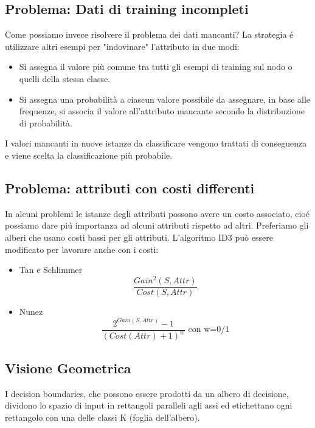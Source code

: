 \documentclass{article}
\begin{document}
\subsection{Problema: Dati di training incompleti}
Come possiamo invece risolvere il problema dei dati mancanti? La strategia é utilizzare altri esempi per "indovinare" l'attributo in due modi:
\begin{itemize}
    \item Si assegna il valore più comune tra tutti gli esempi di training sul nodo o quelli della stessa classe.
    \item Si assegna una probabilità a ciascun valore possibile da assegnare, in base alle frequenze, si associa il valore all'attributo mancante secondo la distribuzione di probabilità.
\end{itemize}
I valori mancanti in nuove istanze da classificare vengono trattati di conseguenza e viene scelta la classificazione più probabile.

\subsection{Problema: attributi con costi differenti}
In alcuni problemi le istanze degli attributi possono avere un costo associato, cioé possiamo dare piú importanza ad alcuni attributi rispetto ad altri. Preferiamo gli alberi che usano costi bassi per gli attributi. L'algoritmo ID3 può essere modificato per lavorare anche con i costi:
\begin{itemize}
    \item Tan e Schlimmer 
        \begin{equation}
            \frac{Gain^2(S,Attr)}{Cost(S,Attr)}
        \end{equation}
    \item Nunez
        \begin{equation}
            \frac{2^{Gain(S,Attr)}-1}{(Cost(Attr)+1)^w} \text{ con w=0/1}
        \end{equation}
\end{itemize}
\clearpage

\subsection{Visione Geometrica}
I decision boundaries, che possono essere prodotti da un albero di decisione, dividono lo spazio di input in rettangoli paralleli agli assi ed etichettano ogni rettangolo con una delle classi K (foglia dell'albero).
\end{document}
